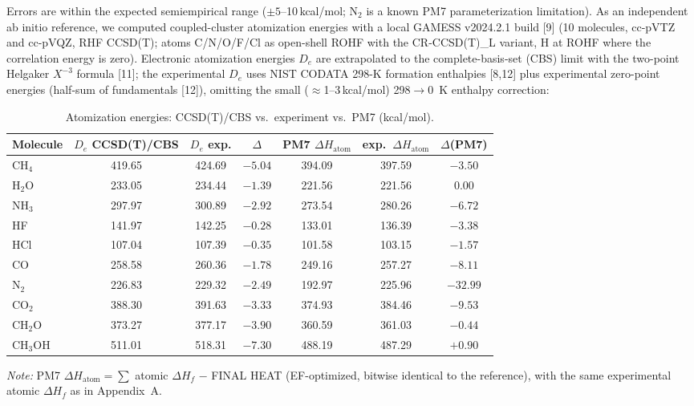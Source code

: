 \documentclass[preprint,12pt]{elsarticle}
\begin{document}
Errors are within the expected semiempirical range ($\pm 5$--10\,kcal/mol; N$_2$ is a known PM7 parameterization limitation). As an independent ab initio reference, we computed coupled-cluster atomization energies with a local GAMESS v2024.2.1 build [9] (10 molecules, cc-pVTZ and cc-pVQZ, RHF CCSD(T); atoms C/N/O/F/Cl as open-shell ROHF with the CR-CCSD(T)\_L variant, H at ROHF where the correlation energy is zero). Electronic atomization energies $D_e$ are extrapolated to the complete-basis-set (CBS) limit with the two-point Helgaker $X^{-3}$ formula [11]; the experimental $D_e$ uses NIST CODATA 298-K formation enthalpies [8,12] plus experimental zero-point energies (half-sum of fundamentals [12]), omitting the small ($\approx$1--3\,kcal/mol) 298$\to$0~K enthalpy correction:
\begin{table}[h]
\centering
\caption{Atomization energies: CCSD(T)/CBS vs.\ experiment vs.\ PM7 (kcal/mol).}\label{tab:atom}
\begin{tabular}{lcccccc}
\toprule
Molecule & $D_e$ CCSD(T)/CBS & $D_e$ exp. & $\Delta$ & PM7 $\Delta H_\mathrm{atom}$ & exp.\ $\Delta H_\mathrm{atom}$ & $\Delta$(PM7) \\
\midrule
CH$_4$ & 419.65 & 424.69 & $-5.04$ & 394.09 & 397.59 & $-3.50$ \\
H$_2$O & 233.05 & 234.44 & $-1.39$ & 221.56 & 221.56 & 0.00 \\
NH$_3$ & 297.97 & 300.89 & $-2.92$ & 273.54 & 280.26 & $-6.72$ \\
HF & 141.97 & 142.25 & $-0.28$ & 133.01 & 136.39 & $-3.38$ \\
HCl & 107.04 & 107.39 & $-0.35$ & 101.58 & 103.15 & $-1.57$ \\
CO & 258.58 & 260.36 & $-1.78$ & 249.16 & 257.27 & $-8.11$ \\
N$_2$ & 226.83 & 229.32 & $-2.49$ & 192.97 & 225.96 & $-32.99$ \\
CO$_2$ & 388.30 & 391.63 & $-3.33$ & 374.93 & 384.46 & $-9.53$ \\
CH$_2$O & 373.27 & 377.17 & $-3.90$ & 360.59 & 361.03 & $-0.44$ \\
CH$_3$OH & 511.01 & 518.31 & $-7.30$ & 488.19 & 487.29 & $+0.90$ \\
\bottomrule
\end{tabular}
\smallskip\small{\emph{Note:} PM7 $\Delta H_\mathrm{atom} = \sum$ atomic $\Delta H_f$ $-$ FINAL HEAT (EF-optimized, bitwise identical to the reference), with the same experimental atomic $\Delta H_f$ as in Appendix~A.}
\end{table}
\end{document}
